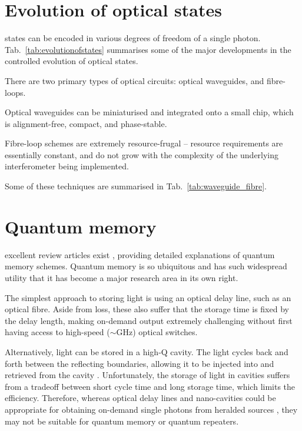%
%

\section{Evolution of optical states}  \label{sec:LO_evolution}

 states can be encoded in various degrees of freedom of a single photon. Tab.~\ref{tab:evolutionofstates} summarises some of the major developments in the controlled evolution of optical states.

There are two primary types of optical circuits: optical waveguides, and fibre-loops.

Optical waveguides can be miniaturised and integrated onto a small chip, which is alignment-free, compact, and phase-stable.

Fibre-loop schemes are extremely resource-frugal -- resource requirements are essentially constant, and do not grow with the complexity of the underlying interferometer being implemented. 

Some of these techniques are summarised in Tab.~\ref{tab:waveguide_fibre}.

%
%

\section{Quantum memory} 

 excellent review articles exist \cite{bib:lvovsky2009optical, bib:simon2010quantum, bib:sangouard2011quantum, bib:bussieres2013prospective, bib:reiserer2015cavity}, providing detailed explanations of quantum memory schemes. Quantum memory is so ubiquitous and has such widespread utility that it has become a major research area in its own right.

The simplest approach to storing light is using an optical delay line, such as an optical fibre. Aside from loss, these also suffer that the storage time is fixed by the delay length, making on-demand output extremely challenging without first having access to high-speed ($\sim$GHz) optical switches.

Alternatively, light can be stored in a high-Q cavity. The light cycles back and forth between the reflecting boundaries, allowing it to be injected into and retrieved from the cavity \cite{bib:pittman2002single, bib:pittman2002cyclical, bib:leung2006quantum, bib:maitre1997quantum, bib:tanabe2007trapping, bib:tanabe2009dynamic}. Unfortunately, the storage of light in cavities suffers from a tradeoff between short cycle time and long storage time, which limits the efficiency. Therefore, whereas optical delay lines and nano-cavities could be appropriate for obtaining on-demand single photons from heralded sources \cite{bib:saglamyurek2015quantum, bib:jin2015telecom}, they may not be suitable for quantum memory or quantum repeaters.

